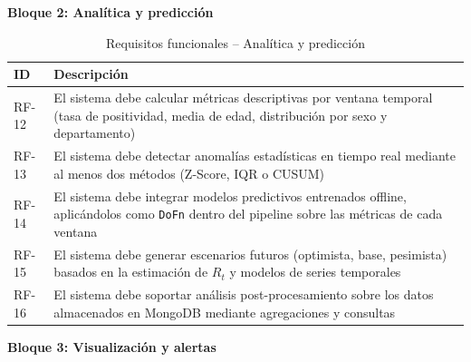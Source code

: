 \documentclass[12pt,a4paper]{article}
\begin{document}
\textbf{Bloque 2: Analítica y predicción}

\begin{table}[H]
    \centering
    \caption{Requisitos funcionales -- Analítica y predicción}
    \begin{tabular}{@{}p{1.5cm}p{12cm}@{}}
        \toprule
        \textbf{ID} & \textbf{Descripción}                                                                                                                                    \\
        \midrule
        RF-12       & El sistema debe calcular métricas descriptivas por ventana temporal (tasa de positividad, media de edad, distribución por sexo y departamento)          \\
        RF-13       & El sistema debe detectar anomalías estadísticas en tiempo real mediante al menos dos métodos (Z-Score, IQR o CUSUM)                                     \\
        RF-14       & El sistema debe integrar modelos predictivos entrenados offline, aplicándolos como \texttt{DoFn} dentro del pipeline sobre las métricas de cada ventana \\
        RF-15       & El sistema debe generar escenarios futuros (optimista, base, pesimista) basados en la estimación de $R_t$ y modelos de series temporales                \\
        RF-16       & El sistema debe soportar análisis post-procesamiento sobre los datos almacenados en MongoDB mediante agregaciones y consultas                           \\
        \bottomrule
    \end{tabular}
\end{table}

\textbf{Bloque 3: Visualización y alertas}
\end{document}
